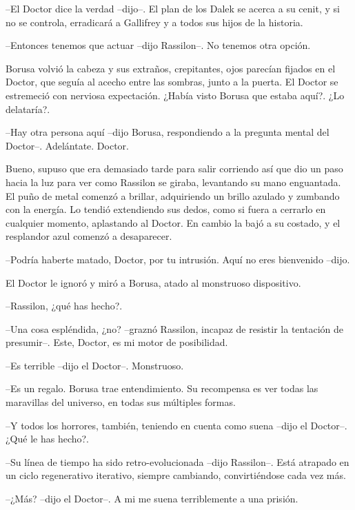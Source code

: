 --El Doctor dice la verdad --dijo--. El plan de los Dalek se acerca a su cenit, y si no se controla, erradicará a Gallifrey y a todos sus hijos de la historia. 

--Entonces tenemos que actuar --dijo Rassilon--. No tenemos otra opción.

 

Borusa volvió la cabeza y sus extraños, crepitantes, ojos parecían fijados en el Doctor, que seguía al acecho entre las sombras, junto a la puerta. El Doctor se estremeció con nerviosa expectación. ¿Había visto Borusa que estaba aquí?. ¿Lo delataría?.

 

--Hay otra persona aquí --dijo Borusa, respondiendo a la pregunta mental del Doctor--. Adelántate. Doctor.

 

Bueno, supuso que era demasiado tarde para salir corriendo así que dio un paso hacia la luz para ver como Rassilon se giraba, levantando su mano enguantada. El puño de metal comenzó a brillar, adquiriendo un brillo azulado y zumbando con la energía. Lo tendió extendiendo sus dedos, como si fuera a cerrarlo en cualquier momento, aplastando al Doctor. En cambio la bajó a su costado, y el resplandor azul comenzó a desaparecer. 



--Podría haberte matado, Doctor, por tu intrusión. Aquí no eres bienvenido --dijo. 



El Doctor le ignoró y miró a Borusa, atado al monstruoso dispositivo. 



--Rassilon, ¿qué has hecho?. 

--Una cosa espléndida, ¿no? --graznó Rassilon, incapaz de resistir la tentación de presumir--. Este, Doctor, es mi motor de posibilidad. 

--Es terrible --dijo el Doctor--. Monstruoso.  

--Es un regalo. Borusa trae entendimiento. Su recompensa es ver todas las maravillas del universo, en todas sus múltiples formas.  

--Y todos los horrores, también, teniendo en cuenta como suena --dijo el Doctor--. ¿Qué le has hecho?.

--Su línea de tiempo ha sido retro-evolucionada --dijo Rassilon--. Está atrapado en un ciclo regenerativo iterativo, siempre cambiando, convirtiéndose cada vez más. 

--¿Más? --dijo el Doctor--. A mi me suena terriblemente a una prisión.  

